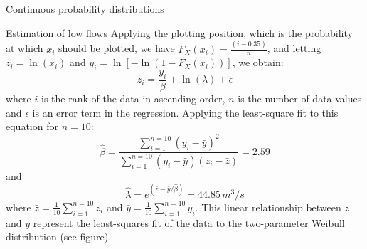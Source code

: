 \documentclass[8pt]{beamer}
\renewcommand{\emph}[1]{\textcolor{myorange}{#1}}
\begin{document}
\begin{frame}{Continuous probability distributions} 
 \begin{exampleblock}{Estimation of low flows} %
     Applying the plotting position, which is the probability at which $x_i$ should be plotted, we have $F_X (x_i) = \frac{(i-0.35)}{n}$, and letting $z_i = \ln (x_i)$ and $ y_i= \ln \left[-\ln \left(1 - F_X (x_i) \right) \right]$, we obtain:
\vspace{-5pt}
     \[
         z_i = \frac{y_i}{\beta} + \ln (\lambda) + \epsilon
     \]
     where $i$ is the rank of the data in ascending order, $n$ is the number of data values and $\epsilon$ is an error term in the regression. Applying the least-square fit to this equation for $n=10$:
\vspace{-5pt}
     \[
         \hat{\beta} = \frac{\sum_{i=1}^{n=10} \left( y_i - \bar{y} \right)^2}{\sum_{i=1}^{n=10} \left( y_i - \bar{y} \right) \left(z_i - \bar{z} \right)} = 2.59
     \]
     and
\vspace{-5pt}
     \[
     \hat{\lambda} = e^{\left( \bar{z} - \bar{y}/\hat{\beta}\right)} = 44.85 \, m^3/s
 \]
 where $\bar{z} = \frac{1}{10}\sum_{i=1}^{n=10} z_i $ and $\bar{y} = \frac{1}{10}\sum_{i=1}^{n=10} y_i $. This linear relationship between $z$ and $y$ represent the least-squares fit  of the data  to the two-parameter  \emph{Weibull distribution} (see figure).


\end{exampleblock}
\end{frame}
\end{document}
